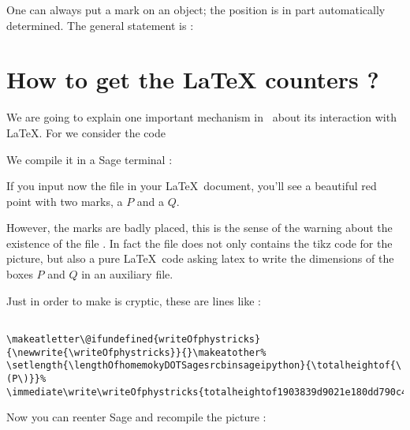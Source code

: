 One can always put a mark on an object; the position is in part automatically determined. The general statement is :



\section{How to get the LaTeX counters ?}
\label{SECooKVXMooMKJAXV}

We are going to explain one important mechanism in \phystricks\ about its interaction with \LaTeX. For we consider the code



We compile it in a Sage terminal :



If you input now the file  in your \LaTeX\ document, you'll see a beautiful red point with two marks, a \( P\) and a \( Q\).  

\begin{center}
   
\end{center}

However, the marks are badly placed, this is the sense of the warning about the existence of the file . In fact the file  does not only contains the tikz code for the picture, but also a pure \LaTeX\ code asking latex to write the dimensions of the boxes \( P\) and \( Q\) in an auxiliary file.

Just in order to make is cryptic, these are lines like :
\begin{verbatim}

\makeatletter\@ifundefined{writeOfphystricks}{\newwrite{\writeOfphystricks}}{}\makeatother%
\setlength{\lengthOfhomemokyDOTSagesrcbinsageipython}{\totalheightof{\(P\)}}%
\immediate\write\writeOfphystricks{totalheightof1903839d9021e180dd790c4cc63081c63b2fe6f1:\the\lengthOfhomemokyDOTSagesrcbinsageipython-}
\end{verbatim}

Now you can reenter Sage and recompile the picture :



